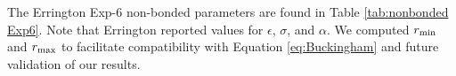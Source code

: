 \documentclass[preprint,letterpaper,floatfix,citeautoscript,aip,jcp]{revtex4-1}
\begin{document}
%


The Errington Exp-6 non-bonded parameters are found in Table \ref{tab:nonbonded Exp6}. Note that Errington reported values for $\epsilon$, $\sigma$, and $\alpha$. We computed $r_{\rm min}$ and $r_{\rm max}$ to facilitate compatibility with Equation \ref{eq:Buckingham} and future validation of our results.
\end{document}
